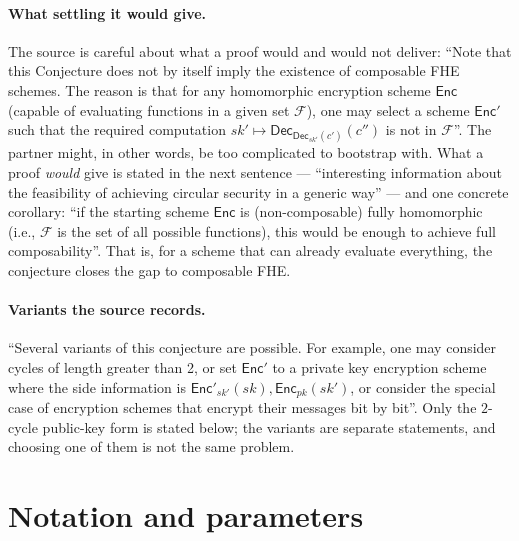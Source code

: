 \documentclass{aicr-conjecture}
\newcommand{\Enc}{\mathsf{Enc}}
\newcommand{\Dec}{\mathsf{Dec}}
\newcommand{\Fset}{\mathcal{F}}
\begin{document}
\paragraph{What settling it would give.}
The source is careful about what a proof would and would not deliver:
``Note that this Conjecture does not by itself imply the existence of
composable FHE schemes. The reason is that for any homomorphic
encryption scheme $\Enc$ (capable of evaluating functions in a given
set $\Fset$), one may select a scheme $\Enc'$ such that the required
computation $sk' \mapsto \Dec_{\Dec_{sk'}(c')}(c'')$ is not in
$\Fset$''. The partner might, in other words, be too complicated to
bootstrap with. What a proof \emph{would} give is stated in the next
sentence --- ``interesting information about the feasibility of
achieving circular security in a generic way'' --- and one concrete
corollary: ``if the starting scheme $\Enc$ is (non-composable) fully
homomorphic (i.e., $\Fset$ is the set of all possible functions), this
would be enough to achieve full composability''. That is, for a scheme
that can already evaluate everything, the conjecture closes the gap to
composable FHE\@.

\paragraph{Variants the source records.}
``Several variants of this conjecture are possible. For example, one
may consider cycles of length greater than 2, or set $\Enc'$ to a
private key encryption scheme where the side information is
$\Enc'_{sk'}(sk), \Enc_{pk}(sk')$, or consider the special case of
encryption schemes that encrypt their messages bit by bit''. Only the
$2$-cycle public-key form is stated below; the variants are separate
statements, and choosing one of them is not the same problem.

\section{Notation and parameters}\label{sec:notation}
\end{document}
